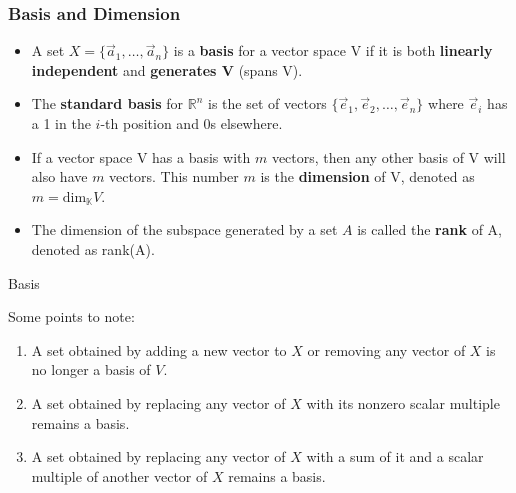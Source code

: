 \documentclass[aspectratio=169,xcolor=dvipsnames,svgnames,x11names,fleqn]{beamer}
\begin{document}
\begin{frame}[containsverbatim]
\frametitle{Basis and Dimension}
\begin{itemize}
    \item A set $X=\{\vec{a}_1, \dots, \vec{a}_n\}$ is a \textbf{basis} for a vector space V if it is both \textbf{linearly independent} and \textbf{generates V} (spans V).
    \item The \textbf{standard basis} for $\mathbb{R}^n$ is the set of vectors $\{\vec{e}_1, \vec{e}_2, \dots, \vec{e}_n\}$ where $\vec{e}_i$ has a 1 in the $i$-th position and 0s elsewhere.
    \item If a vector space V has a basis with $m$ vectors, then any other basis of V will also have $m$ vectors. This number $m$ is the \textbf{dimension} of V, denoted as $m = \text{dim}_{\mathbb{K}}V$.
    \item The dimension of the subspace generated by a set $A$ is called the \textbf{rank} of A, denoted as rank(A).
\end{itemize}
\end{frame}

\begin{frame}{Basis}

    Some points to note:
    \begin{enumerate}
    \item A set obtained by adding a new vector to $X$ or removing any vector of $X$ is no longer a basis of $V$.
    
    \item A set obtained by replacing any vector of $X$ with its nonzero scalar multiple remains a basis.
    
    \item A set obtained by replacing any vector of $X$ with a sum of it and a scalar multiple of another vector of $X$ remains a basis.
\end{enumerate}
    
\end{frame}
\end{document}
